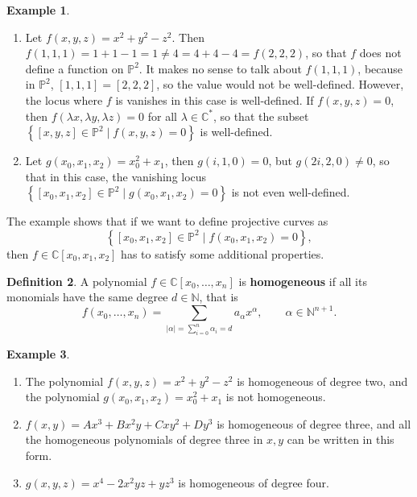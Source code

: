 \documentclass{article}
\newcommand{\N}{\mathbb{N}}
\newcommand{\C}{\mathbb{C}}
\renewcommand{\P}{\mathbb{P}}
\newcommand{\rb}[1]{\left( #1 \right)}
\renewcommand{\sb}[1]{\left[ #1 \right]}
\newcommand{\cb}[1]{\left\{ #1 \right\}}
\newcommand{\abs}[1]{\left\lvert #1 \right\rvert}
\theoremstyle{definition}\newtheorem{definition}{Definition}[section]
\theoremstyle{definition}\newtheorem{notation}[definition]{Notation}
\theoremstyle{definition}\newtheorem{remark}[definition]{Remark}
\theoremstyle{definition}\newtheorem{example}[definition]{Example}
\theoremstyle{definition}\newtheorem{fact}{Fact}
\theoremstyle{definition}\newtheorem{exercise}{Exercise}
\begin{document}
\begin{example}
\hfill
\begin{enumerate}
\item Let $ f\rb{x, y, z} = x^2 + y^2 - z^2 $. Then $ f\rb{1, 1, 1} = 1 + 1 - 1 = 1 \ne 4 = 4 + 4 - 4 = f\rb{2, 2, 2} $, so that $ f $ does not define a function on $ \P^2 $. It makes no sense to talk about $ f\rb{1, 1, 1} $, because in $ \P^2 $, $ \sb{1, 1, 1} = \sb{2, 2, 2} $, so the value would not be well-defined. However, the locus where $ f $ is vanishes in this case is well-defined. If $ f\rb{x, y, z} = 0 $, then $ f\rb{\lambda x, \lambda y, \lambda z} = 0 $ for all $ \lambda \in \C^* $, so that the subset $ \cb{\sb{x, y, z} \in \P^2 \mid f\rb{x, y, z} = 0} $ is well-defined.
\item Let $ g\rb{x_0, x_1, x_2} = x_0^2 + x_1 $, then $ g\rb{i, 1, 0} = 0 $, but $ g\rb{2i, 2, 0} \ne 0 $, so that in this case, the vanishing locus $ \cb{\sb{x_0, x_1, x_2} \in \P^2 \mid g\rb{x_0, x_1, x_2} = 0} $ is not even well-defined.
\end{enumerate}
\end{example}

The example shows that if we want to define projective curves as
$$ \cb{\sb{x_0, x_1, x_2} \in \P^2 \mid f\rb{x_0, x_1, x_2} = 0}, $$
then $ f \in \C\sb{x_0, x_1, x_2} $ has to satisfy some additional properties.

\begin{definition}
A polynomial $ f \in \C\sb{x_0, \dots, x_n} $ is \textbf{homogeneous} if all its monomials have the same degree $ d \in \N $, that is
$$ f\rb{x_0, \dots, x_n} = \sum_{\abs{\alpha} = \sum_{i = 0}^n \alpha_i = d} a_\alpha x^\alpha, \qquad \alpha \in \N^{n + 1}. $$
\end{definition}

\begin{example}
\hfill
\begin{enumerate}
\item The polynomial $ f\rb{x, y, z} = x^2 + y^2 - z^2 $ is homogeneous of degree two, and the polynomial $ g\rb{x_0, x_1, x_2} = x_0^2 + x_1 $ is not homogeneous.
\item $ f\rb{x, y} = Ax^3 + Bx^2y + Cxy^2 + Dy^3 $ is homogeneous of degree three, and all the homogeneous polynomials of degree three in $ x, y $ can be written in this form.
\item $ g\rb{x, y, z} = x^4 - 2x^2yz + yz^3 $ is homogeneous of degree four.
\end{enumerate}
\end{example}
\end{document}
